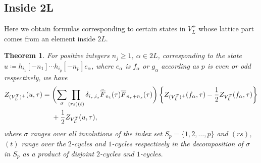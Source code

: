 \documentclass[pdftex]{sigma}
\numberwithin{equation}{section}
\newtheorem{Theorem}{Theorem}[section]
\theoremstyle{definition}
\begin{document}
\subsection{Inside 2L}

Here we obtain formulas corresponding to certain states in $V_L^+$ whose lattice part comes from an element inside $2L$.

\begin{Theorem}\label{Inside 2L}
 For positive integers $n_j\geq 1$, $\alpha\in 2L$, corresponding to the state
$u\coloneqq h_{i_1}[-n_1]\cdots\allowbreak h_{i_p}[-n_p]e_{\alpha}$,
 where $e_{\alpha}$ is $f_{\alpha}$ or $g_{\alpha}$ according as $p$ is even or odd respectively, we have
 \begin{align*}
 Z_{(V_L^T)^+}(u,\tau)={}&\biggl(\sum_{\sigma}\prod_{(rs)(t)}\delta_{i_r,i_s}\Tilde{\overline{F}}_{n_t}(\tau)\overline{F}_{n_r+n_s}(\tau)\biggr)
 \left\{Z_{(V_L^T)^+}(f_{\alpha},\tau)-\frac{1}{2}Z_{V_L^T}(f_{\alpha},\tau)\right\}\\
 &+\frac{1}{2}Z_{V_L^T}(u,\tau),
 \end{align*}
 where $\sigma$ ranges over all involutions of the index set $S_p=\{1,2,\dots, p\}$ and $(rs)$, $(t)$ range over the $2$-cycles and $1$-cycles respectively in the decomposition of $\sigma$ in $S_p$ as a product of disjoint $2$-cycles and $1$-cycles.
\end{Theorem}
\end{document}
